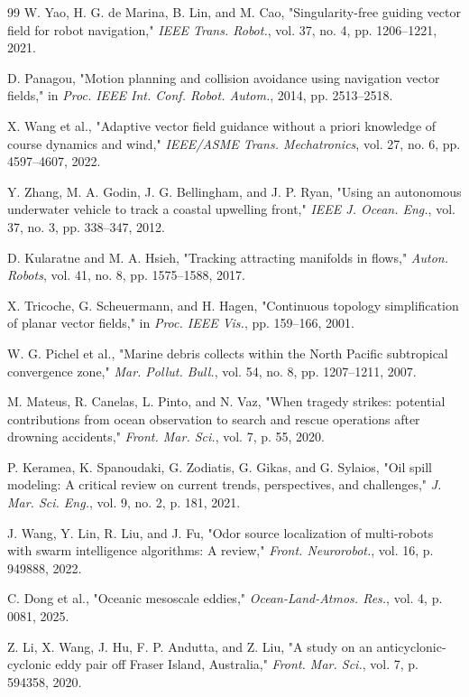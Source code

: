\documentclass[lettersize,journal]{IEEEtran}
\begin{document}
\begin{thebibliography}{99}
 W. Yao, H. G. de Marina, B. Lin, and M. Cao, "Singularity-free guiding vector field for robot navigation," \textit{IEEE Trans. Robot.}, vol. 37, no. 4, pp. 1206--1221, 2021.

 D. Panagou, "Motion planning and collision avoidance using navigation vector fields," in \textit{Proc. IEEE Int. Conf. Robot. Autom.}, 2014, pp. 2513--2518.

 X. Wang et al., "Adaptive vector field guidance without a priori knowledge of course dynamics and wind," \textit{IEEE/ASME Trans. Mechatronics}, vol. 27, no. 6, pp. 4597--4607, 2022.

 Y. Zhang, M. A. Godin, J. G. Bellingham, and J. P. Ryan, "Using an autonomous underwater vehicle to track a coastal upwelling front," \textit{IEEE J. Ocean. Eng.}, vol. 37, no. 3, pp. 338--347, 2012.

 D. Kularatne and M. A. Hsieh, "Tracking attracting manifolds in flows," \textit{Auton. Robots}, vol. 41, no. 8, pp. 1575--1588, 2017.

 X. Tricoche, G. Scheuermann, and H. Hagen, "Continuous topology simplification of planar vector fields," in \textit{Proc. IEEE Vis.}, pp. 159--166, 2001.

 W. G. Pichel et al., "Marine debris collects within the North Pacific subtropical convergence zone," \textit{Mar. Pollut. Bull.}, vol. 54, no. 8, pp. 1207--1211, 2007.

 M. Mateus, R. Canelas, L. Pinto, and N. Vaz, "When tragedy strikes: potential contributions from ocean observation to search and rescue operations after drowning accidents," \textit{Front. Mar. Sci.}, vol. 7, p. 55, 2020.

 P. Keramea, K. Spanoudaki, G. Zodiatis, G. Gikas, and G. Sylaios, "Oil spill modeling: A critical review on current trends, perspectives, and challenges," \textit{J. Mar. Sci. Eng.}, vol. 9, no. 2, p. 181, 2021.

 J. Wang, Y. Lin, R. Liu, and J. Fu, "Odor source localization of multi-robots with swarm intelligence algorithms: A review," \textit{Front. Neurorobot.}, vol. 16, p. 949888, 2022.

 C. Dong et al., "Oceanic mesoscale eddies," \textit{Ocean-Land-Atmos. Res.}, vol. 4, p. 0081, 2025.

 Z. Li, X. Wang, J. Hu, F. P. Andutta, and Z. Liu, "A study on an anticyclonic-cyclonic eddy pair off Fraser Island, Australia," \textit{Front. Mar. Sci.}, vol. 7, p. 594358, 2020.


\end{thebibliography}
\end{document}
